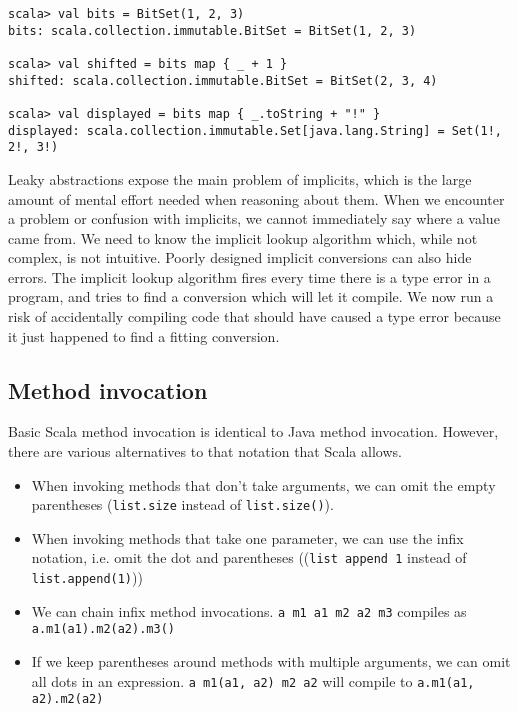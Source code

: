 \begin{lstlisting}[caption=Bitset example, label=code:bitset]
scala> val bits = BitSet(1, 2, 3)
bits: scala.collection.immutable.BitSet = BitSet(1, 2, 3)

scala> val shifted = bits map { _ + 1 }
shifted: scala.collection.immutable.BitSet = BitSet(2, 3, 4)

scala> val displayed = bits map { _.toString + "!" }
displayed: scala.collection.immutable.Set[java.lang.String] = Set(1!, 2!, 3!)
\end{lstlisting}

Leaky abstractions expose the main problem of implicits, which is the large amount of mental effort needed when reasoning about them.
When we encounter a problem or confusion with implicits, we cannot immediately say where a value came from.
We need to know the implicit lookup algorithm which, while not complex, is not intuitive.
Poorly designed implicit conversions can also hide errors.
The implicit lookup algorithm fires every time there is a type error in a program, and tries to find a conversion which will let it compile.
We now run a risk of accidentally compiling code that should have caused a type error because it just happened to find a fitting conversion.

\subsection{Method invocation}

Basic Scala method invocation is identical to Java method invocation.
However, there are various alternatives to that notation that Scala allows.

\begin{itemize}
	\item When invoking methods that don't take arguments, we can omit the empty parentheses (\texttt{list.size} instead of \texttt{list.size()}).
	\item When invoking methods that take one parameter, we can use the infix notation, i.e. omit the dot and parentheses ((\texttt{list append 1} instead of \texttt{list.append(1)}))
	\item We can chain infix method invocations.
\texttt{a m1 a1 m2 a2 m3} compiles as\\ \texttt{a.m1(a1).m2(a2).m3()}
	\item If we keep parentheses around methods with multiple arguments, we can omit all dots in an expression.
\texttt{a m1(a1, a2) m2 a2} will compile to \texttt{a.m1(a1, a2).m2(a2)}
\end{itemize}

